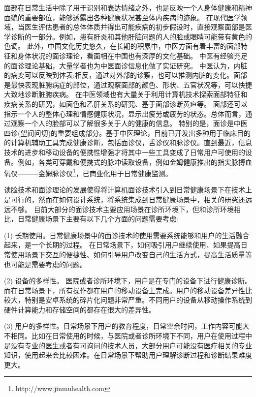 面部在日常生活中除了用于识别和表达情绪之外，也是反映一个人身体健康和精神面貌的重要部位，能够透露出各种健康状况甚至体内疾病的迹象。
在现代医学领域，当医生评估患者的总体体质并得出可能疾病的初步假设时，直接观察面部是医学诊断的一部分\cite{Clifford2006Shortliffe}。例如，患有肝炎和其他肝脏问题的人的脸或眼睛可能带有黄色的色调\cite{Li2008Therapeutic}。
此外，中国文化历史悠久，在长期的积累中，中医方面有着丰富的面部特征和身体状况的面诊理论，看面相在中国也有深厚的文化基础。
中医有经验充足的面诊理论基础，大量学者也为中医面诊信息化做了实证研究。
中医认为，内脏的病变可以反映到体表;相反，通过对外部的诊察，也可以推测内脏的变化\cite{杨淑芳2002伤寒六经辨证初探}。面部是最快表现脏腑病症的部位，通过观察面部的颜色、形状、五官状况等，可以快捷大致地诊断脏腑疾病。
在中医领域也有大量关于利用计算机技术探索面部特征和疾病关系的研究，如面色和乙肝关系的研究\cite{杨宏志2007慢性乙型肝炎肝硬化中医面部五色诊断与临床病理的相关性研究}、基于面部诊断黄疸\cite{艾英1998黄疸病人面部色泽定量实验研究}等。
面部还可以指示一个人的整体心理和情感健康状况，显示出疲劳或疲劳的状态。总体而言，通过观察一个人的脸部可以了解很多关于人的健康的信息。
特别的是，面诊是中医四诊(望闻问切)的重要组成部分。基于中医理论，目前已开发出多种用于临床目的的计算机辅助工具完成健康诊断，包括面诊仪\cite{Liu2014Computerized}，舌诊仪\cite{Wang2004An}和脉诊仪\cite{Shu2007Developing}。直到最近，信息技术的进步和移动设备的便携性增强才将其中一些工具变成了日常用户可使用的设备。例如，各类可穿戴和便携式的脉冲读取设备，例如金姆健康推出的指尖脉搏血氧仪———金姆脉诊仪\footnote{http://www.jinmuhealth.com}，已商业化用于日常健康监测。


读脸技术和面诊理论的发展使得将计算机面诊技术引入到日常健康场景下在技术上是可行的，然而在如何设计系统，将系统集成到日常健康场景中，相关的研究还远远不够。
目前大部分的面诊技术主要应用场景在诊所环境下，但和诊所环境相比，日常健康场景下主要有以下几个方面的问题需要考虑: 

(1) 长期使用。日常健康场景中的面诊技术的使用需要系统能够和用户的生活融合起来，是一个长期的过程。 在日常场景下，如何吸引用户继续使用、如果提高日常使用场景下交互的便捷性、如何引导用户改变自己的生活方式，提高生活质量等也可能是需要考虑的问题。

(2) 设备的多样性。 医院或者诊所环境下，用户是在专门的设备下进行健康诊断。而在日常场景下，所有操作都在用户的移动设备上完成。用户的移动设备差异性比较大，特别是安卓系统的碎片化问题非常严重。不同用户的设备从移动操作系统到硬件计算能力和存储空间的都存在很大的差异性。

(3) 用户的多样性。日常场景下用户的教育程度，日常空余时间，工作内容可能大不相同。比如在日常使用的时候，与医院或者诊所环境下不同，用户在使用过程中是没有专业的医生或者有可询问的技术人员，大部分用户可能没有医疗相关的专业知识，使用起来会比较困难。在日常场景下帮助用户理解诊断过程和诊断结果难度更大。

